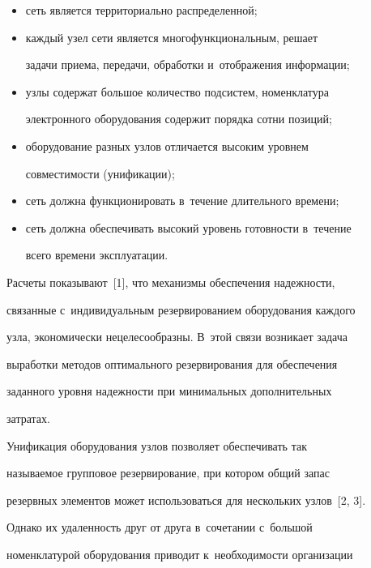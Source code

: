    \begin{itemize}


\item сеть является территориально распределенной;


\item каждый узел сети является многофункциональным, решает 


задачи приема, передачи, обработки и~отображения информации;


\item узлы содержат большое количество подсистем, номенклатура 


электронного оборудования содержит порядка сотни позиций;


\item оборудование разных узлов отличается высоким уровнем 


совместимости (унификации);


\item сеть должна функционировать в~течение длительного времени;


\item сеть должна обеспечивать высокий уровень готовности в~течение 


всего времени эксплуатации.


\end{itemize}


   


   Расчеты показывают~[1], что механизмы обеспечения надежности, 


связанные с~индивидуальным резервированием оборудования каждого 


узла, экономически нецелесообразны. В~этой связи возникает задача 


выработки методов оптимального резервирования для обеспечения 


заданного уровня надежности при минимальных дополнительных 


затратах.


   


   Унификация оборудования узлов позволяет обеспечивать так 


называемое групповое резервирование, при котором общий запас 


резервных элементов может использоваться для нескольких узлов~[2, 3]. 


Однако их удаленность друг от друга в~сочетании с~большой 


номенклатурой оборудования приводит к~необходимости организации 


